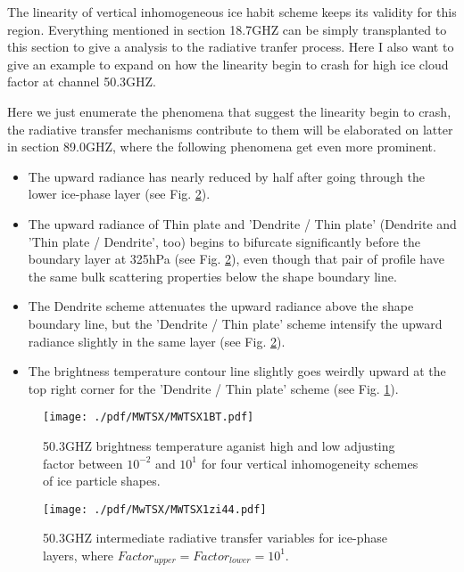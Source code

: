 The linearity of vertical inhomogeneous ice habit scheme keeps its validity for this region. Everything mentioned in section 18.7GHZ can be 
simply transplanted to this section to give a analysis to the radiative tranfer process.
Here I also want to give an example to expand on how the linearity begin to crash for high ice cloud factor at channel 50.3GHZ.

Here we just enumerate the phenomena that suggest the linearity begin to crash, the radiative transfer mechanisms contribute
to them will be elaborated on latter in section 89.0GHZ, where the following phenomena get even more prominent.

\begin{itemize}
    \item The upward radiance has nearly reduced by half after going through the lower ice-phase layer (see Fig. \ref{fig:MWTSX1zi44}).
    \item The upward radiance of Thin plate and 'Dendrite / Thin plate' (Dendrite and 'Thin plate / Dendrite', too) 
begins to bifurcate significantly before the boundary layer at 325hPa (see Fig. \ref{fig:MWTSX1zi44}),
even though that pair of profile have the same bulk scattering properties below the shape boundary line.
    \item The Dendrite scheme attenuates the upward radiance above the shape boundary line, but the 'Dendrite / Thin plate'
scheme intensify the upward radiance slightly in the same layer (see Fig. \ref{fig:MWTSX1zi44}).
    \item The brightness temperature contour line slightly goes weirdly upward at the top right corner for the 'Dendrite / Thin plate' scheme
    (see Fig. \ref{fig:MWTSX1BT}). 
\end{itemize}

\begin{figure}[hbtp] 
\centering
\texttt{[image: ./pdf/MWTSX/MWTSX1BT.pdf]}
\caption{50.3GHZ brightness temperature aganist high and low adjusting factor between $10^{-2}$ and $10^{1}$ for four vertical 
inhomogeneity schemes of ice particle shapes.}
\label{fig:MWTSX1BT}
\end{figure}

\begin{figure}[hbtp] 
\centering
\texttt{[image: ./pdf/MwTSX/MWTSX1zi44.pdf]}
\caption{50.3GHZ intermediate radiative transfer variables for ice-phase layers, where $Factor_{upper} = Factor_{lower} = 10^{1}$.}
\label{fig:MWTSX1zi44}
\end{figure}


